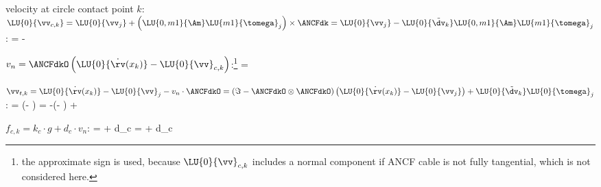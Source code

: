   \item velocity at circle contact point $k$: $\LU{0}{\vv_{c,k}} = \LU{0}{\vv_j} + \left( \LU{0,m1}{\Am} \LU{m1}{\tomega}_{j} \right) \times \ANCFdk = \LU{0}{\vv_j} - \LU{0}{\tilde \dv_k} \LU{0,m1}{\Am} \LU{m1}{\tomega}_{j} $:
  \be
     =  -  
  \ee
  \item $v_n = \ANCFdkO \left( \LU{0}{\dot \rv(x_{k})} - \LU{0}{\vv}_{c,k} \right)$:\footnote{the approximate sign is used, because $\LU{0}{\vv}_{c,k}$ includes a normal component if ANCF cable is not fully tangential, which is not considered here.}
  \be
     = \ANCFdkO {} 
    \approx %
        \ANCFdkOtp \diffANCFdk
  \ee
  \item $\vv_{t,k} = \LU{0}{\dot \rv(x_{k})} - \LU{0}{\vv}_j - v_n \cdot \ANCFdkO =
  \left(\Im - \ANCFdkO \otimes \ANCFdkO \right) \left( \LU{0}{\dot \rv(x_{k})} - \LU{0}{\vv_j} \right) 
      +\LU{0}{\tilde \dv_k} \LU{0}{\tomega}_{j} $:
  \be
     = \left(\Im - \ANCFdkO \otimes \ANCFdkO \right) 
  \ee
  \be
     = -\left(\Im - \ANCFdkO \otimes \ANCFdkO \right)  +  
  \ee
  \item $f_{c,k} = k_c \cdot g  + d_c \cdot v_n$:
  \be 
     =   + d_c \cdot {}
    \approx {}
  \ee
  \be 
     =   + d_c \cdot {}
    \approx {}
  \ee
  \be 
  \ee  
  \be 
